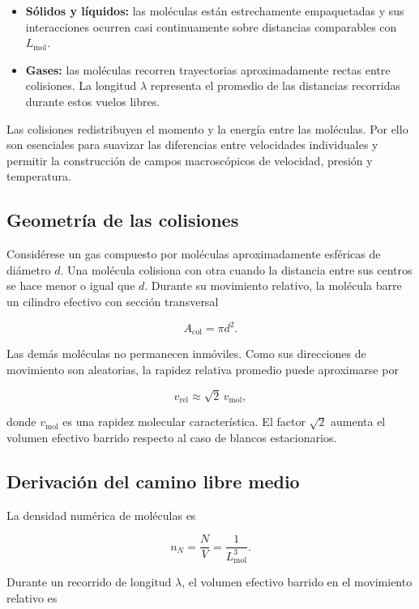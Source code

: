 \begin{itemize}
    \item \textbf{Sólidos y líquidos:} las moléculas están estrechamente
    empaquetadas y sus interacciones ocurren casi continuamente sobre
    distancias comparables con $L_{\mathrm{mol}}$.

    \item \textbf{Gases:} las moléculas recorren trayectorias aproximadamente
    rectas entre colisiones. La longitud $\lambda$ representa el promedio de
    las distancias recorridas durante estos vuelos libres.
\end{itemize}

Las colisiones redistribuyen el momento y la energía entre las moléculas. Por
ello son esenciales para suavizar las diferencias entre velocidades
individuales y permitir la construcción de campos macroscópicos de velocidad,
presión y temperatura.

\subsection{Geometría de las colisiones}

Considérese un gas compuesto por moléculas aproximadamente esféricas de
diámetro $d$. Una molécula colisiona con otra cuando la distancia entre sus
centros se hace menor o igual que $d$. Durante su movimiento relativo, la
molécula barre un cilindro efectivo con sección transversal

$$
A_{\mathrm{col}}=\pi d^2.
$$

Las demás moléculas no permanecen inmóviles. Como sus direcciones de
movimiento son aleatorias, la rapidez relativa promedio puede aproximarse por

$$
v_{\mathrm{rel}}\approx\sqrt{2}\,v_{\mathrm{mol}},
$$

donde $v_{\mathrm{mol}}$ es una rapidez molecular característica. El factor
$\sqrt{2}$ aumenta el volumen efectivo barrido respecto al caso de blancos
estacionarios.

\figuraGeometriaCaminoLibreMedio

\subsection{Derivación del camino libre medio}

La densidad numérica de moléculas es

$$
n_N=\frac{N}{V}=\frac{1}{L_{\mathrm{mol}}^3}.
$$

Durante un recorrido de longitud $\lambda$, el volumen efectivo barrido en el
movimiento relativo es

